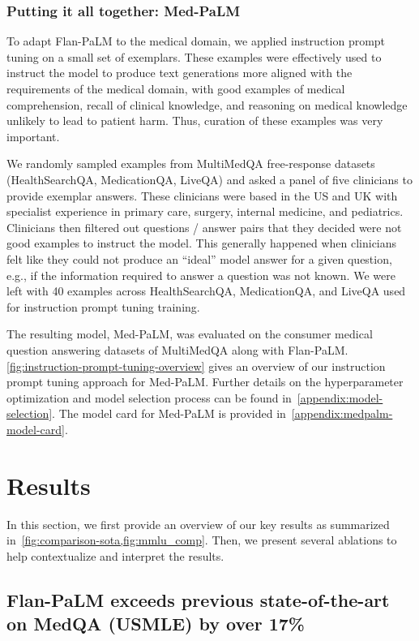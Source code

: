\subsubsection{Putting it all together: Med-PaLM} To adapt Flan-PaLM to the medical domain, we applied instruction prompt tuning on a small set of exemplars. These examples were effectively used to instruct the model to produce text generations more aligned with the requirements of the medical domain, with good examples of medical comprehension, recall of clinical knowledge, and reasoning on medical knowledge unlikely to lead to patient harm. Thus, curation of these examples was very important. 

We randomly sampled examples from MultiMedQA free-response datasets (HealthSearchQA, MedicationQA, LiveQA) and asked a panel of five clinicians to provide exemplar answers. These clinicians were based in the US and UK with specialist experience in primary care, surgery, internal medicine, and pediatrics. Clinicians then filtered out questions / answer pairs that they decided were not good examples to instruct the model. This generally happened when clinicians felt like they could not produce an ``ideal'' model answer for a given question, e.g., if the information required to answer a question was not known. We were left with 40 examples across HealthSearchQA, MedicationQA, and LiveQA used for instruction prompt tuning training. 

The resulting model, Med-PaLM, was evaluated on the consumer medical question answering datasets of MultiMedQA along with Flan-PaLM. \ref{fig:instruction-prompt-tuning-overview} gives an overview of our instruction prompt tuning approach for Med-PaLM. Further details on the hyperparameter optimization and model selection process can be found in~\ref{appendix:model-selection}. The model card for Med-PaLM is provided in~\ref{appendix:medpalm-model-card}.

\section{Results}
\label{sec:results}

In this section, we first provide an overview of our key results as summarized in~\ref{fig:comparison-sota,fig:mmlu_comp}. Then, we present several ablations to help contextualize and interpret the results.

\subsection{Flan-PaLM exceeds previous state-of-the-art on MedQA (USMLE) by over 17\%}

